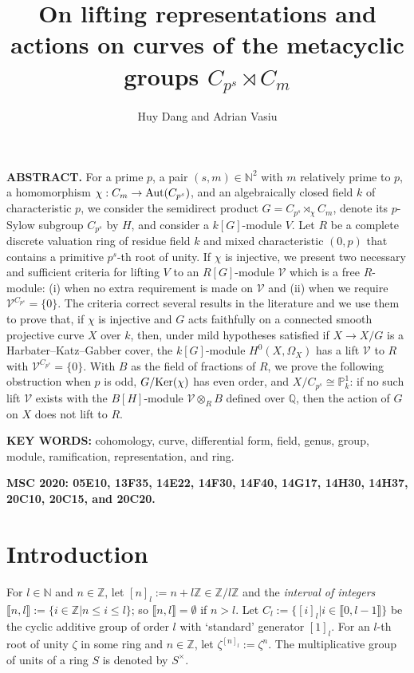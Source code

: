\documentclass[11pt]{amsart}
\def\Aut{\textup{Aut}}
\def\Ker{\textup{Ker}}
\begin{document}
\title[On lifting representations and actions]{On lifting representations and actions on curves of the metacyclic groups $C_{p^s}\rtimes C_m$}
\author{Huy Dang and Adrian Vasiu}
\maketitle
 
\noindent
{\bf ABSTRACT.} For a prime $p$, a pair $(s,m)\in\mathbb N^2$ with $m$ relatively prime to $p$, a homomorphism $\chi:C_m\rightarrow\Aut(C_{p^s})$, and an algebraically closed field $k$ of characteristic $p$, we consider the semidirect product $G=C_{p^s}\rtimes_{\chi} C_m$, denote its $p$-Sylow subgroup $C_{p^s}$ by $H$, and consider a $k[G]$-module $V$. Let $R$ be a complete discrete valuation ring of residue field $k$ and mixed characteristic $(0,p)$ that contains a primitive $p^s$-th root of unity. If $\chi$ is injective, we present two necessary and sufficient criteria for lifting $V$ to an $R[G]$-module $\mathcal V$ which is a free $R$-module: (i) when no extra requirement is made on $\mathcal V$ and (ii) when we require $\mathcal V^{C_{p^s}}=\{0\}$. The criteria correct several results in the literature and we use them to prove that, if $\chi$ is injective and $G$ acts faithfully on a connected smooth projective curve $X$ over $k$, then, under mild hypotheses satisfied if $X\rightarrow X/G$ is a Harbater--Katz--Gabber cover, the $k[G]$-module $H^0(X,\Omega_X)$ has a lift $\mathcal V$ to $R$ with $\mathcal V^{C_{p^s}}=\{0\}$. With $B$ as the field of fractions of $R$, we prove the following obstruction when $p$ is odd, $G/\Ker(\chi)$ has even order, and $X/C_{p^s}\cong\mathbb P^1_k$: if no such lift $\mathcal V$ exists with the $B[H]$-module $\mathcal V\otimes_R B$ defined over $\mathbb Q$, then the action of $G$ on $X$ does not lift to $R$.
 
\bigskip\noindent
{\bf KEY WORDS:} cohomology, curve, differential form, field, genus, group, module, ramification, representation, and ring.
 
\bigskip\noindent
{\bf MSC 2020: 05E10, 13F35, 14E22, 14F30, 14F40, 14G17, 14H30, 14H37, 20C10, 20C15, and 20C20.} 

\section{Introduction}\label{S1}

For $l\in\mathbb N$ and $n\in\mathbb Z$, let $[n]_l:=n+l\mathbb Z\in\mathbb Z/l\mathbb Z$ and the {\it interval of integers} $\llbracket n,l\rrbracket:=\{i\in\mathbb Z|n\le i\le l\}$; so $\llbracket n,l\rrbracket=\emptyset$ if $n>l$. Let $C_l:=\{[i]_l|i\in\llbracket0,l-1\rrbracket\}$ be the cyclic additive group of order $l$ with `standard' generator $[1]_l$. For an $l$-th root of unity $\zeta$ in some ring and $n\in\mathbb Z$, let $\zeta^{[n]_l}:=\zeta^n$. The multiplicative group of units of a ring $S$ is denoted by $S^{\times}$.
\end{document}
